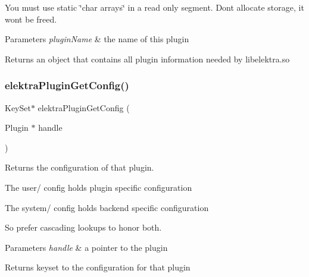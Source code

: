 You must use static \char`\"{}char arrays\char`\"{} in a read only segment. Don\textquotesingle{}t allocate storage, it won\textquotesingle{}t be freed.


\begin{DoxyParams}{Parameters}
{\em plugin\+Name} & the name of this plugin \\
\hline
\end{DoxyParams}
\begin{DoxyReturn}{Returns}
an object that contains all plugin information needed by libelektra.\+so 
\end{DoxyReturn}
\mbox{\label{group__plugin_ga644bead796506c172817724051c977c9}} 
\subsubsection{\texorpdfstring{elektra\+Plugin\+Get\+Config()}{elektraPluginGetConfig()}}
{\footnotesize\ttfamily Key\+Set$\ast$ elektra\+Plugin\+Get\+Config (\begin{DoxyParamCaption}\item[{Plugin $\ast$}]{handle }\end{DoxyParamCaption})}



Returns the configuration of that plugin. 


\begin{DoxyItemize}
\item The user/ config holds plugin specific configuration
\item The system/ config holds backend specific configuration
\end{DoxyItemize}

So prefer cascading lookups to honor both.


\begin{DoxyParams}{Parameters}
{\em handle} & a pointer to the plugin\\
\hline
\end{DoxyParams}
\begin{DoxyReturn}{Returns}
keyset to the configuration for that plugin 
\end{DoxyReturn}
\mbox{\label{group__plugin_gaafcf3216b46292f222b8cc7828b4dd20}} 
